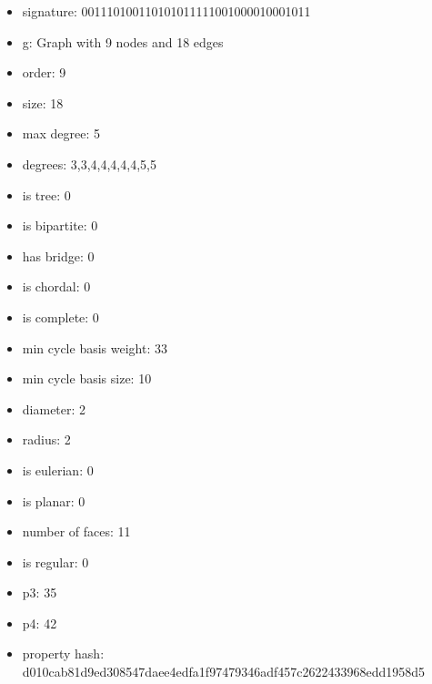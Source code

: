 \newpage
\begin{figure}
\end{figure}
\begin{itemize}
\item signature: 001110100110101011111001000010001011
\item g: Graph with 9 nodes and 18 edges
\item order: 9
\item size: 18
\item max degree: 5
\item degrees: 3,3,4,4,4,4,4,5,5
\item is tree: 0
\item is bipartite: 0
\item has bridge: 0
\item is chordal: 0
\item is complete: 0
\item min cycle basis weight: 33
\item min cycle basis size: 10
\item diameter: 2
\item radius: 2
\item is eulerian: 0
\item is planar: 0
\item number of faces: 11
\item is regular: 0
\item p3: 35
\item p4: 42
\item property hash: d010cab81d9ed308547daee4edfa1f97479346adf457c2622433968edd1958d5
\end{itemize}
